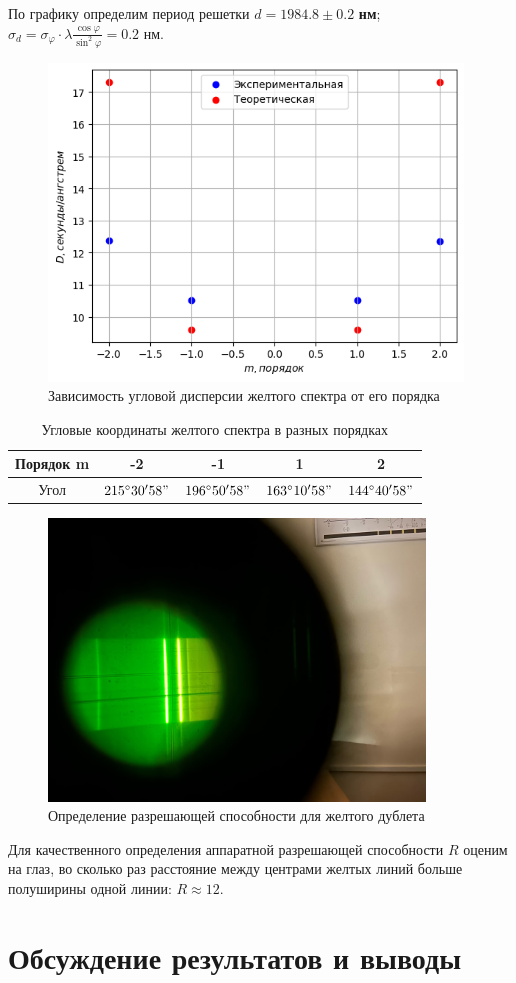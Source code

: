 \indent По графику определим период решетки {\boldmath$d = 1984.8 \pm 0.2$} \textbf{нм}; 
$\sigma_d = \sigma_{\varphi}\cdot \lambda \frac{\cos\varphi}{{\sin^2\varphi}} = 0.2$ нм.

\begin{figure}[h!]
    \centering
    \includegraphics[width=11cm]{images/plot2.png}
    \caption{Зависимость угловой дисперсии желтого спектра от его порядка}
\end{figure}

\begin{table}[h!]
    \centering
    \begin{tabular}{|c|c|c|c|c|}
        \hline
        Порядок m & -2 & -1 & 1 & 2 \\\hline
        Угол  & $215^{\circ}30'58"$ & $196^{\circ}50'58"$ & $163^{\circ}10'58"$ & $144^{\circ}40'58"$ \\\hline
    \end{tabular}
    \caption{Угловые координаты желтого спектра в разных порядках}
\end{table}

\begin{figure}[h!]
    \centering
    \includegraphics[width=10cm]{images/getR.jpg}
    \caption{Определение разрешающей способности для желтого дублета}
\end{figure}

Для качественного определения аппаратной разрешающей способности $R$ оценим на глаз, во сколько раз расстояние между центрами желтых линий больше полуширины одной линии: $R \approx 12$.

\section*{Обсуждение результатов и выводы}














